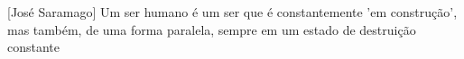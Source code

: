 

\begin{ntquote}

[José Saramago]{%
Um ser humano é um ser que é constantemente 'em construção', mas também, de uma forma paralela, sempre em um estado de destruição constante%
}

\end{ntquote}